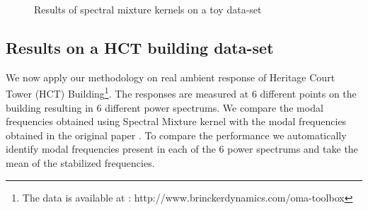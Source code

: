 \begin{figure}[!ht]
  \centering
  \quad
    \quad
  
  \caption{Results of spectral mixture kernels on a toy data-set}
\end{figure}

\subsection{Results on a HCT building data-set}
We now apply our methodology on real ambient response of Heritage Court Tower (HCT) Building\footnote{The data is available at : http://www.brinckerdynamics.com/oma-toolbox}. The responses are measured at 6 different points on the building resulting in 6 different power spectrums. We compare the modal frequencies obtained using Spectral Mixture kernel with the modal frequencies obtained in the original paper \cite{brincker2000modal}. To compare the performance we automatically identify modal frequencies present in each of the 6 power spectrums and take the mean of the stabilized frequencies.

